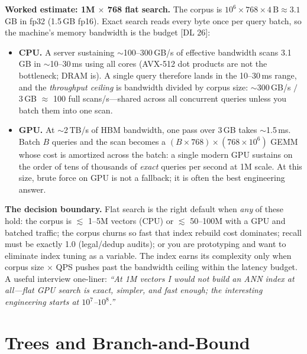 \textbf{Worked estimate: 1M $\times$ 768 flat search.} The corpus is $10^6 \times 768 \times 4\,\mathrm{B} \approx 3.1$\,GB in fp32 (1.5\,GB fp16). Exact search reads every byte once per query batch, so the machine's memory bandwidth is the budget [DL 26]:
\begin{itemize}
    \item \textbf{CPU.} A server sustaining $\sim$100--300\,GB/s of effective bandwidth scans 3.1\,GB in $\sim$10--30\,ms using all cores (AVX-512 dot products are not the bottleneck; DRAM is). A single query therefore lands in the 10--30\,ms range, and the \emph{throughput ceiling} is bandwidth divided by corpus size: $\sim$300\,GB/s $/$ 3\,GB $\approx$ 100 full scans/s---shared across all concurrent queries unless you batch them into one scan.
    \item \textbf{GPU.} At $\sim$2\,TB/s of HBM bandwidth, one pass over 3\,GB takes $\sim$1.5\,ms. Batch $B$ queries and the scan becomes a $(B \times 768) \times (768 \times 10^6)$ GEMM whose cost is amortized across the batch: a single modern GPU sustains on the order of tens of thousands of \emph{exact} queries per second at 1M scale. At this size, brute force on GPU is not a fallback; it is often the best engineering answer.
\end{itemize}

\textbf{The decision boundary.} Flat search is the right default when \emph{any} of these hold: the corpus is $\lesssim$ 1--5M vectors (CPU) or $\lesssim$ 50--100M with a GPU and batched traffic; the corpus churns so fast that index rebuild cost dominates; recall must be exactly 1.0 (legal/dedup audits); or you are prototyping and want to eliminate index tuning as a variable. The index earns its complexity only when corpus size $\times$ QPS pushes past the bandwidth ceiling within the latency budget. A useful interview one-liner: \emph{``At 1M vectors I would not build an ANN index at all---flat GPU search is exact, simpler, and fast enough; the interesting engineering starts at $10^7$--$10^8$.''}

\section{Trees and Branch-and-Bound}
\label{sr:sec:vr_trees}

